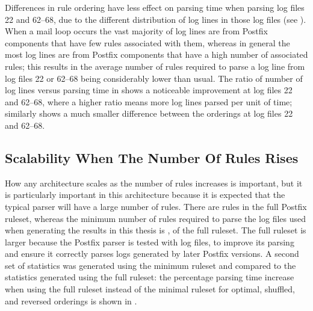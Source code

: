 

Differences in rule ordering have less effect on parsing time when parsing
log files 22 and 62--68, due to the different distribution of log lines in
those log files (see ).
When a mail loop occurs the vast majority of log lines are from Postfix
components that have few rules associated with them, whereas in general the
most log lines are from Postfix components that have a high number of
associated rules; this results in the average number of rules required to
parse a log line from log files 22 or 62--68 being considerably lower than
usual.  The ratio of number of log lines versus parsing time in
 shows a
noticeable improvement at log files 22 and 62--68, where a higher ratio
means more log lines parsed per unit of time; similarly  shows a much smaller difference
between the orderings at log files 22 and 62--68.

\subsection{Scalability When The Number Of Rules Rises}

\label{scalability as the number of rules rises}

How any architecture scales as the number of rules increases is important,
but it is particularly important in this architecture because it is
expected that the typical parser will have a large number of rules.  There
are \numberOFrules{} rules in the full Postfix ruleset, whereas the minimum
number of rules required to parse the \numberOFlogFILES{} log files used
when generating the results in this thesis is \numberOFrulesMINIMUM{},
\numberOFrulesMINIMUMpercentage{} of the full ruleset.  The full ruleset is
larger because the Postfix parser is tested with \numberOFlogFILESall{} log
files, to improve its parsing and ensure it correctly parses logs generated
by later Postfix versions.  A second set of statistics was generated using
the minimum ruleset and compared to the statistics generated using the full
ruleset: the percentage parsing time increase when using the full ruleset
instead of the minimal ruleset for optimal, shuffled, and reversed
orderings is shown in .

